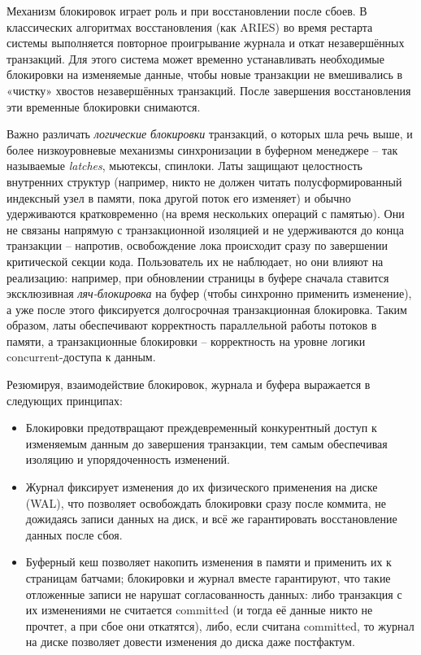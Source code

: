  Механизм блокировок играет роль и при восстановлении после сбоев. В классических алгоритмах восстановления (как ARIES) во время рестарта системы выполняется повторное проигрывание журнала и откат незавершённых транзакций. Для этого система может временно устанавливать необходимые блокировки на изменяемые данные, чтобы новые транзакции не вмешивались в «чистку» хвостов незавершённых транзакций. После завершения восстановления эти временные блокировки снимаются. 

 Важно различать \textit{логические блокировки} транзакций, о которых шла речь выше, и более низкоуровневые механизмы синхронизации в буферном менеджере – так называемые \textit{latches}, мьютексы, спинлоки. Латы защищают целостность внутренних структур (например, никто не должен читать полусформированный индексный узел в памяти, пока другой поток его изменяет) и обычно удерживаются кратковременно (на время нескольких операций с памятью). Они не связаны напрямую с транзакционной изоляцией и не удерживаются до конца транзакции – напротив, освобождение лока происходит сразу по завершении критической секции кода. Пользователь их не наблюдает, но они влияют на реализацию: например, при обновлении страницы в буфере сначала ставится эксклюзивная \textit{ляч-блокировка} на буфер (чтобы синхронно применить изменение), а уже после этого фиксируется долгосрочная транзакционная блокировка. Таким образом, латы обеспечивают корректность параллельной работы потоков в памяти, а транзакционные блокировки – корректность на уровне логики concurrent-доступа к данным. 

 Резюмируя, взаимодействие блокировок, журнала и буфера выражается в следующих принципах:
 \begin{itemize}
    \item Блокировки предотвращают преждевременный конкурентный доступ к изменяемым данным до завершения транзакции, тем самым обеспечивая изоляцию и упорядоченность изменений.
    \item Журнал фиксирует изменения до их физического применения на диске (WAL), что позволяет освобождать блокировки сразу после коммита, не дожидаясь записи данных на диск, и всё же гарантировать восстановление данных после сбоя.
    \item Буферный кеш позволяет накопить изменения в памяти и применить их к страницам батчами; блокировки и журнал вместе гарантируют, что такие отложенные записи не нарушат согласованность данных: либо транзакция с их изменениями не считается committed (и тогда её данные никто не прочтет, а при сбое они откатятся), либо, если считана committed, то журнал на диске позволяет довести изменения до диска даже постфактум.
 \end{itemize}

